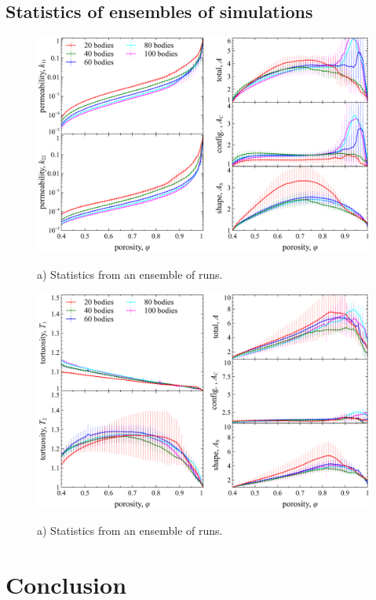 \documentclass[3p]{elsarticle}
\begin{document}
\subsection{Statistics of ensembles of simulations}

\begin{figure}%
\centering \label{fig5}
\includegraphics[width = 0.99 \textwidth]{./figs/fig5.pdf}
\caption{
a) Statistics from an ensemble of runs.
}
\end{figure}

\begin{figure}%
\centering \label{fig6}
\includegraphics[width = 0.99 \textwidth]{./figs/fig6.pdf}
\caption{
a) Statistics from an ensemble of runs.
}
\end{figure}

\section{Conclusion}
\label{sec:conclusion}



\end{document}
